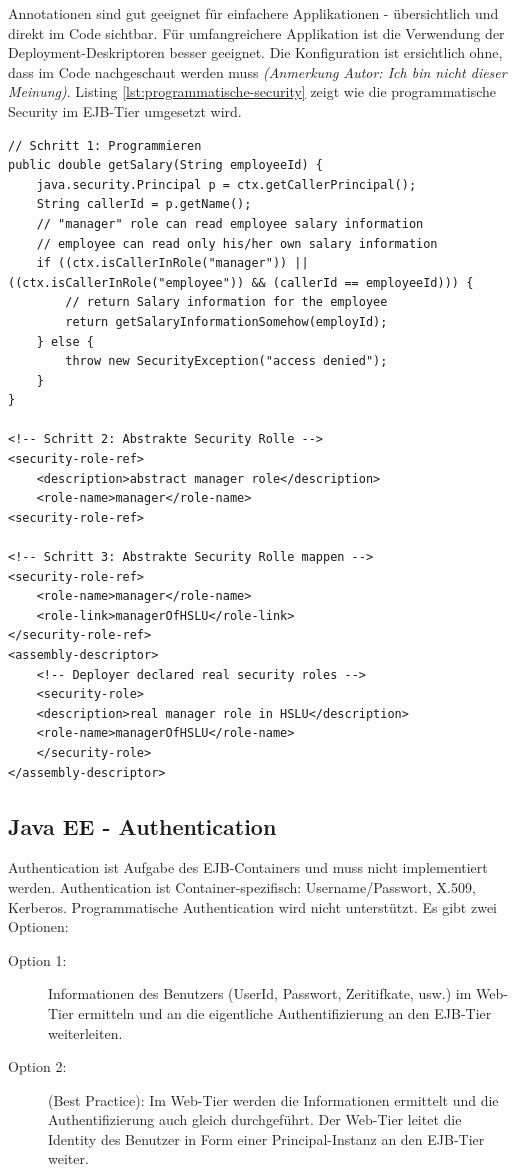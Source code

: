 Annotationen sind gut geeignet für einfachere Applikationen - übersichtlich und direkt im Code sichtbar. Für umfangreichere Applikation ist die Verwendung der Deployment-Deskriptoren besser geeignet. Die Konfiguration ist ersichtlich ohne, dass im Code nachgeschaut werden muss \emph{(Anmerkung Autor: Ich bin nicht dieser Meinung)}. Listing \ref{lst:programmatische-security} zeigt wie die programmatische Security im EJB-Tier umgesetzt wird.

\newpage

\begin{lstlisting}[caption=Programmatische Security im EJB-Tier, label=lst:programmatische-security]
// Schritt 1: Programmieren
public double getSalary(String employeeId) {
	java.security.Principal p = ctx.getCallerPrincipal();
	String callerId = p.getName();
	// "manager" role can read employee salary information
	// employee can read only his/her own salary information
	if ((ctx.isCallerInRole("manager")) || ((ctx.isCallerInRole("employee")) && (callerId == employeeId))) {
		// return Salary information for the employee
		return getSalaryInformationSomehow(employId);
	} else {
		throw new SecurityException("access denied");
	}
}

<!-- Schritt 2: Abstrakte Security Rolle -->
<security-role-ref>
	<description>abstract manager role</description>
	<role-name>manager</role-name>
<security-role-ref>

<!-- Schritt 3: Abstrakte Security Rolle mappen -->
<security-role-ref>
	<role-name>manager</role-name>
	<role-link>managerOfHSLU</role-link>
</security-role-ref>
<assembly-descriptor>
	<!-- Deployer declared real security roles -->
	<security-role>
	<description>real manager role in HSLU</description>
	<role-name>managerOfHSLU</role-name>
	</security-role>
</assembly-descriptor>
\end{lstlisting}

\subsection{Java EE - Authentication}
Authentication ist Aufgabe des EJB-Containers und muss nicht implementiert werden. Authentication ist Container-spezifisch: Username/Passwort, X.509, Kerberos. Programmatische Authentication wird nicht unterstützt. Es gibt zwei Optionen:

\begin{description}
	\item[Option 1:] Informationen des Benutzers (UserId, Passwort, Zeritifkate, usw.) im Web-Tier ermitteln und an die eigentliche Authentifizierung an den EJB-Tier weiterleiten. 
	\item[Option 2:] (Best Practice): Im Web-Tier werden die Informationen ermittelt und die Authentifizierung auch gleich durchgeführt. Der Web-Tier leitet die Identity des Benutzer in Form einer Principal-Instanz an den EJB-Tier weiter. 
\end{description}

